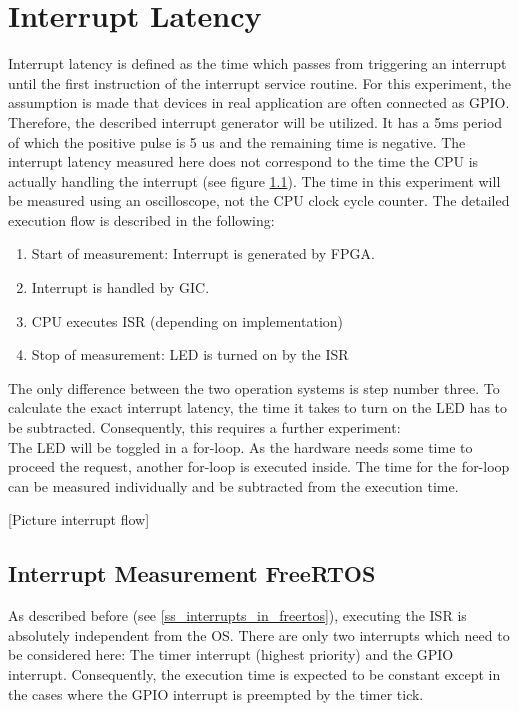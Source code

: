 \section{Interrupt Latency}
Interrupt latency is defined as the time which passes from triggering an interrupt until the first instruction of the interrupt service routine. 
For this  experiment, the assumption is made that devices in real application are often connected as \ac{GPIO}.
Therefore, the described interrupt generator will be utilized.
It has a 5ms period of which the positive pulse is 5 us and the remaining time is negative.
The interrupt latency measured here does not correspond to the time the \ac{CPU} is actually handling the interrupt (see figure \ref{}).
The time in this experiment will be measured using an oscilloscope, not the \ac{CPU} clock cycle counter.
The detailed execution flow is described in the following:
\begin{enumerate}
	\item Start of measurement: Interrupt is generated by \ac{FPGA}.
	\item Interrupt is handled by \ac{GIC}.
	\item \ac{CPU} executes \ac{ISR} (depending on implementation)
	\item Stop of measurement: \ac{LED} is turned on by the \ac{ISR}
\end{enumerate}
The only difference between the two operation systems is step number three. 
To calculate the exact interrupt latency, the time it takes to turn on the \ac{LED} has to be subtracted.
Consequently, this requires a further experiment:\\
The \ac{LED} will be toggled in a for-loop.
As the hardware needs some time to proceed the request, another for-loop is executed inside.
The time for the for-loop can be measured individually and be subtracted from the execution time.

[Picture interrupt flow]

\subsection{Interrupt Measurement FreeRTOS}
As described before (see \ref{ss_interrupts_in_freertos}), executing the \ac{ISR} is absolutely independent from the \ac{OS}.
There are only two interrupts which need to be considered here: The timer interrupt (highest priority) and the \ac{GPIO} interrupt.
Consequently, the execution time is expected to be constant except in the cases where the \ac{GPIO} interrupt is preempted by the timer tick.

